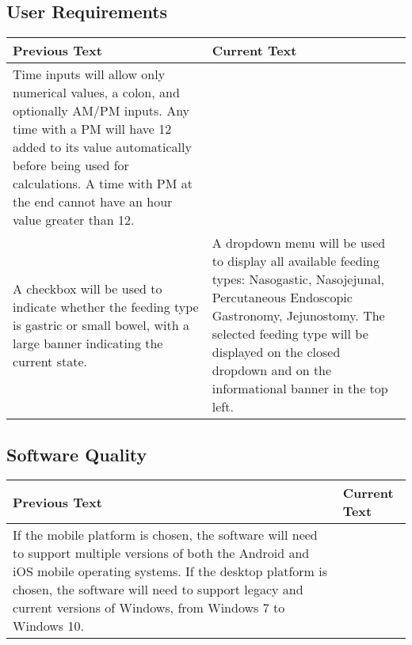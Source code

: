 \documentclass[fullpage,10pt, onecolumn, draftclsnofoot]{IEEEtran}
\begin{document}
\subsection{User Requirements}
\begin{tabular}{| p{} | p{} |}
\hline
Previous Text & Current Text \\
\hline
Time inputs will allow only numerical values, a colon, and optionally AM/PM inputs. Any time with a PM will
have 12 added to its value automatically before being used for calculations. A time with PM at the end cannot have an hour value greater than 12.
&
\\ \hline
A checkbox will be used to indicate whether the feeding type is gastric or
small bowel, with a large banner indicating the current state.
&
A dropdown menu will be used to display all available feeding types: Nasogastic, Nasojejunal, Percutaneous Endoscopic Gastronomy, Jejunostomy.
The selected feeding type will be displayed on the closed dropdown and on the informational banner in the top left. 
\\
\hline
\end{tabular}
\subsection{Software Quality}
\begin{tabular}{| p{} | p{} |}
\hline
Previous Text & Current Text \\
\hline
If the mobile platform is chosen, the software will need to support 
multiple versions of both the Android and iOS mobile operating systems. If the desktop platform is chosen, the software will need
to support legacy and current versions of Windows, from Windows 7 to Windows 10.
&
\\ \hline
\end{tabular}
\end{document}
